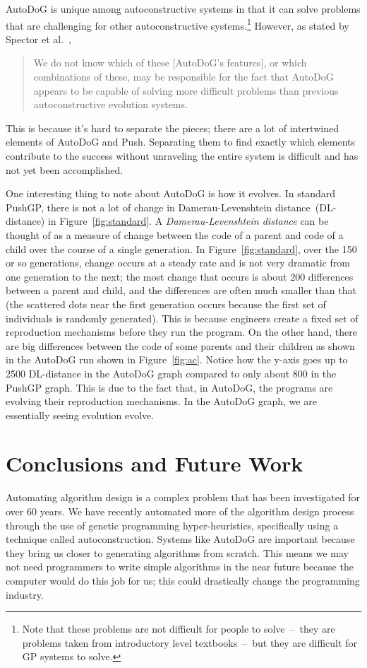 \documentclass{sig-alternate}
\begin{document}
AutoDoG is unique among autoconstructive systems in that it can solve problems that are challenging for other autoconstructive systems.\footnote{Note that these problems are not difficult for people to solve~--~they are problems taken from introductory level textbooks~--~but they are difficult for GP systems to solve.} However, as stated by Spector et al.~\cite{spector:2016},
\begin{quotation}
	We do not know which of these [AutoDoG's features], or which combinations of these, may be responsible for the fact that AutoDoG appears to be capable of solving more difficult problems than previous autoconstructive evolution systems.
\end{quotation}
This is because it's hard to separate the pieces; there are a lot of intertwined elements of AutoDoG and Push. Separating them to find exactly which elements contribute to the success without unraveling the entire system is difficult and has not yet been accomplished.

One interesting thing to note about AutoDoG is how it evolves. In standard PushGP, there is not a lot of change in Damerau-Levenshtein distance~(DL-distance) in Figure~\ref{fig:standard}. A \textit{Damerau-Levenshtein distance} can be thought of as a measure of change between the code of a parent and code of a child over the course of a single generation. In Figure~\ref{fig:standard}, over the 150 or so generations, change occurs at a steady rate and is not very dramatic from one generation to the next; the most change that occurs is about 200 differences between a parent and child, and the differences are often much smaller than that (the scattered dots near the first generation occurs because the first set of individuals is randomly generated). This is because engineers create a fixed set of reproduction mechanisms before they run the program. On the other hand, there are big differences between the code of some parents and their children as shown in the AutoDoG run shown in Figure~\ref{fig:ac}. Notice how the y-axis goes up to 2500 DL-distance in the AutoDoG graph compared to only about 800 in the PushGP graph. This is due to the fact that, in AutoDoG, the programs are evolving their reproduction mechanisms. In the AutoDoG graph, we are essentially seeing evolution evolve.

\section{Conclusions and Future Work}
\label{sec:conclusion}
Automating algorithm design is a complex problem that has been investigated for over 60 years. We have recently automated more of the algorithm design process through the use of genetic programming hyper-heuristics, specifically using a technique called autoconstruction. Systems like AutoDoG are important because they bring us closer to generating algorithms from scratch. This means we may not need programmers to write simple algorithms in the near future because the computer would do this job for us; this could drastically change the programming industry.
\end{document}
